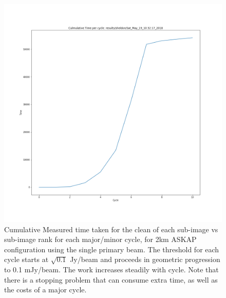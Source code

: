 \documentclass[11pt,a4paper,variablewidth]{article}
\begin{document}
\begin{figure}[H]
  \centering
  \includegraphics[width=\textwidth]{./pngs/culm_time_per_cycle.png}
  \caption{Cumulative Measured time taken for the clean of each sub-image vs sub-image rank for each major/minor cycle, for 2km ASKAP configuration using the single primary beam. The threshold for each cycle starts at $\sqrt{0.1}$ Jy/beam and proceeds in geometric progression to 0.1 mJy/beam. The work increases steadily with cycle. Note that there is a stopping problem that can consume extra time, as well as the costs of a major cycle.}
  \label{fig:culm_time_vs_cycle}
\end{figure}
\end{document}
